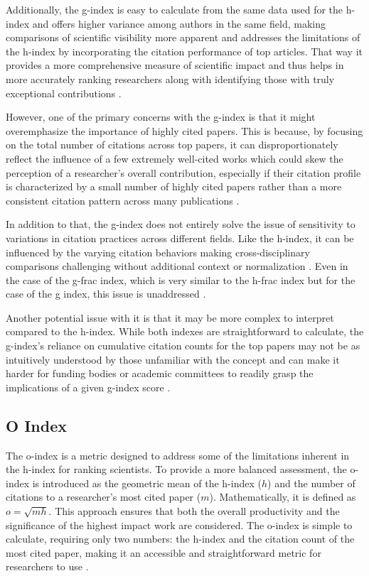 Additionally, the g-index is easy to calculate from the same data used for the
h-index and offers higher variance among authors in the same field, making
comparisons of scientific visibility more apparent and addresses the
limitations of the h-index by incorporating the citation performance of top
articles. That way it provides a more comprehensive measure of scientific
impact and thus helps in more accurately ranking researchers along with
identifying those with truly exceptional contributions
\cite{egghe2008mathematical, egghe2006theory, egghe2006improvement}.

However, one of the primary concerns with the g-index is that it might
overemphasize the importance of highly cited papers. This is because, by
focusing on the total number of citations across top papers, it can
disproportionately reflect the influence of a few extremely well-cited works
which could skew the perception of a researcher's overall contribution,
especially if their citation profile is characterized by a small number of
highly cited papers rather than a more consistent citation pattern across many
publications \cite{egghe2008mathematical}.

In addition to that, the g-index does not entirely solve the issue of
sensitivity to variations in citation practices across different fields. Like
the h-index, it can be influenced by the varying citation behaviors making
cross-disciplinary comparisons challenging without additional context or
normalization \cite{egghe2008mathematical, egghe2006theory,
    egghe2006improvement}. Even in the case of the g-frac index, which is very
similar to the h-frac index but for the case of the g index, this issue is
unaddressed \cite{egghe2008mathematical}.

Another potential issue with it is that it may be more complex to interpret
compared to the h-index. While both indexes are straightforward to calculate,
the g-index's reliance on cumulative citation counts for the top papers may not
be as intuitively understood by those unfamiliar with the concept and can make
it harder for funding bodies or academic committees to readily grasp the
implications of a given g-index score \cite{egghe2008mathematical,
    egghe2006improvement}.

\subsection{O Index}
The o-index is a metric designed to address some of the limitations inherent in
the h-index for ranking scientists. To provide a more balanced assessment, the
o-index is introduced as the geometric mean of the h-index ($h$) and the number
of citations to a researcher's most cited paper ($m$). Mathematically, it is
defined as $o = \sqrt{mh}$. This approach ensures that both the overall
productivity and the significance of the highest impact work are considered.
The o-index is simple to calculate, requiring only two numbers: the h-index and
the citation count of the most cited paper, making it an accessible and
straightforward metric for researchers to use \cite{dorogovtsev2015ranking}.

